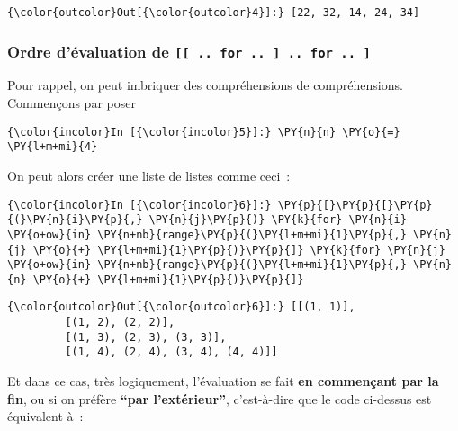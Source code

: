 \begin{Verbatim}[commandchars=\\\{\},frame=single,framerule=0.3mm,rulecolor=\color{cellframecolor}]
{\color{outcolor}Out[{\color{outcolor}4}]:} [22, 32, 14, 24, 34]
\end{Verbatim}
            
    \hypertarget{ordre-duxe9valuation-de-..-for-..-..-for-..}{%
\subsubsection{\texorpdfstring{Ordre d'évaluation de
\texttt{{[}{[}\ ..\ for\ ..\ {]}\ ..\ for\ ..\ {]}}}{Ordre d'évaluation de {[}{[} .. for .. {]} .. for .. {]}}}\label{ordre-duxe9valuation-de-..-for-..-..-for-..}}

    Pour rappel, on peut imbriquer des compréhensions de compréhensions.
Commençons par poser

    \begin{Verbatim}[commandchars=\\\{\},frame=single,framerule=0.3mm,rulecolor=\color{cellframecolor}]
{\color{incolor}In [{\color{incolor}5}]:} \PY{n}{n} \PY{o}{=} \PY{l+m+mi}{4}
\end{Verbatim}


    On peut alors créer une liste de listes comme ceci~:

    \begin{Verbatim}[commandchars=\\\{\},frame=single,framerule=0.3mm,rulecolor=\color{cellframecolor}]
{\color{incolor}In [{\color{incolor}6}]:} \PY{p}{[}\PY{p}{[}\PY{p}{(}\PY{n}{i}\PY{p}{,} \PY{n}{j}\PY{p}{)} \PY{k}{for} \PY{n}{i} \PY{o+ow}{in} \PY{n+nb}{range}\PY{p}{(}\PY{l+m+mi}{1}\PY{p}{,} \PY{n}{j} \PY{o}{+} \PY{l+m+mi}{1}\PY{p}{)}\PY{p}{]} \PY{k}{for} \PY{n}{j} \PY{o+ow}{in} \PY{n+nb}{range}\PY{p}{(}\PY{l+m+mi}{1}\PY{p}{,} \PY{n}{n} \PY{o}{+} \PY{l+m+mi}{1}\PY{p}{)}\PY{p}{]}
\end{Verbatim}


\begin{Verbatim}[commandchars=\\\{\},frame=single,framerule=0.3mm,rulecolor=\color{cellframecolor}]
{\color{outcolor}Out[{\color{outcolor}6}]:} [[(1, 1)],
         [(1, 2), (2, 2)],
         [(1, 3), (2, 3), (3, 3)],
         [(1, 4), (2, 4), (3, 4), (4, 4)]]
\end{Verbatim}
            
    Et dans ce cas, très logiquement, l'évaluation se fait \textbf{en
commençant par la fin}, ou si on préfère \textbf{``par l'extérieur''},
c'est-à-dire que le code ci-dessus est équivalent à~:

